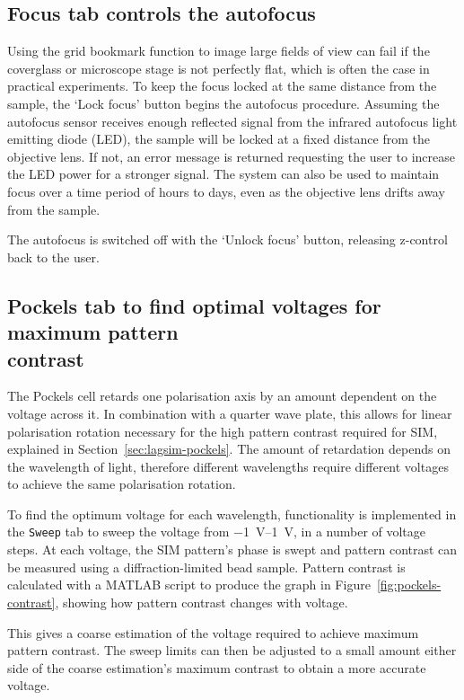 \subsection{Focus tab controls the autofocus} \label{sec:lagsimFocus}
Using the grid bookmark function to image large fields of view can fail if the coverglass or microscope stage is not perfectly flat, which is often the case in practical experiments.
To keep the focus locked at the same distance from the sample, the `Lock focus' button begins the autofocus procedure.
Assuming the autofocus sensor receives enough reflected signal from the infrared autofocus light emitting diode (LED), the sample will be locked at a fixed distance from the objective lens.
If not, an error message is returned requesting the user to increase the LED power for a stronger signal.
The system can also be used to maintain focus over a time period of hours to days, even as the objective lens drifts away from the sample.

The autofocus is switched off with the `Unlock focus' button, releasing z-control back to the user.

\subsection[Pockels tab to find optimal voltages for maximum pattern contrast]{Pockels tab to find optimal voltages for maximum pattern\\ contrast}
The Pockels cell retards one polarisation axis by an amount dependent on the voltage across it.
In combination with a quarter wave plate, this allows for linear polarisation rotation necessary for the high pattern contrast required for SIM, explained in Section~\ref{sec:lagsim-pockels}.
The amount of retardation depends on the wavelength of light, therefore different wavelengths require different voltages to achieve the same polarisation rotation.

To find the optimum voltage for each wavelength, functionality is implemented in the \texttt{Sweep} tab to sweep the voltage from \SIrange{-1}{1}{\volt}, in a number of voltage steps.
At each voltage, the SIM pattern's phase is swept and pattern contrast can be measured using a diffraction-limited bead sample.
Pattern contrast is calculated with a MATLAB script to produce the graph in Figure~\ref{fig:pockels-contrast}, showing how pattern contrast changes with voltage.

This gives a coarse estimation of the voltage required to achieve maximum pattern contrast.
The sweep limits can then be adjusted to a small amount either side of the coarse estimation's maximum contrast to obtain a more accurate voltage.

